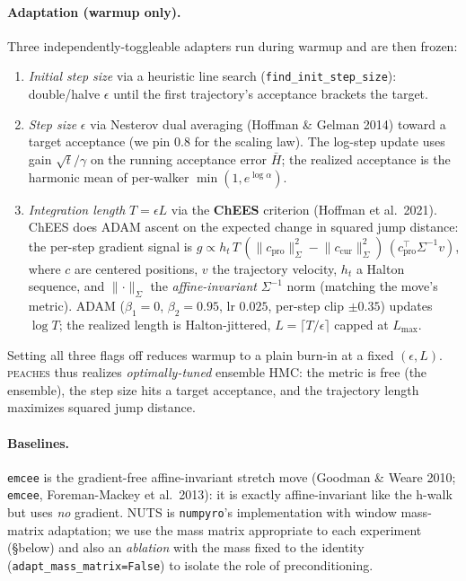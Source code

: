 \documentclass[11pt]{article}
\begin{document}
\paragraph{Adaptation (warmup only).} Three independently-toggleable adapters
run during warmup and are then frozen:
\begin{enumerate}
\item \emph{Initial step size} via a heuristic line search
(\texttt{find\_init\_step\_size}): double/halve $\epsilon$ until the first
trajectory's acceptance brackets the target.
\item \emph{Step size} $\epsilon$ via Nesterov dual averaging (Hoffman \& Gelman
2014) toward a target acceptance (we pin $0.8$ for the scaling law). The
log-step update uses gain $\sqrt{t}/\gamma$ on the running acceptance error
$\bar H$; the realized acceptance is the harmonic mean of per-walker
$\min(1,e^{\log\alpha})$.
\item \emph{Integration length} $T=\epsilon L$ via the \textbf{ChEES} criterion
(Hoffman et al.\ 2021). ChEES does ADAM ascent on the expected change in
squared jump distance: the per-step gradient signal is
$g \propto h_t\,T\,(\lVert c_{\text{pro}}\rVert_\Sigma^2 -
\lVert c_{\text{cur}}\rVert_\Sigma^2)\,(c_{\text{pro}}^{\!\top}\Sigma^{-1} v)$,
where $c$ are centered positions, $v$ the trajectory velocity, $h_t$ a Halton
sequence, and $\lVert\cdot\rVert_\Sigma$ the \emph{affine-invariant}
$\Sigma^{-1}$ norm (matching the move's metric). ADAM ($\beta_1{=}0$,
$\beta_2{=}0.95$, lr $0.025$, per-step clip $\pm0.35$) updates $\log T$; the
realized length is Halton-jittered, $L=\lceil T/\epsilon\rceil$ capped at
$L_{\max}$.
\end{enumerate}
Setting all three flags off reduces warmup to a plain burn-in at a fixed
$(\epsilon,L)$. \textsc{peaches} thus realizes \emph{optimally-tuned} ensemble
HMC: the metric is free (the ensemble), the step size hits a target acceptance,
and the trajectory length maximizes squared jump distance.

\paragraph{Baselines.} \texttt{emcee} is the gradient-free affine-invariant
stretch move (Goodman \& Weare 2010; \texttt{emcee}, Foreman-Mackey et al.\
2013): it is exactly affine-invariant like the h-walk but uses \emph{no}
gradient. NUTS is \texttt{numpyro}'s implementation with window mass-matrix
adaptation; we use the mass matrix appropriate to each experiment (\S below) and
also an \emph{ablation} with the mass fixed to the identity
(\texttt{adapt\_mass\_matrix=False}) to isolate the role of preconditioning.
\end{document}
